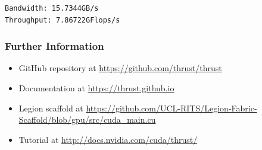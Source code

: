 \begin{Shaded}
\begin{Highlighting}[]

  \NormalTok{, }\NormalTok{, }\NormalTok{> \{}
    
      
    
     
    
     \NormalTok{()(}     \NormalTok{\{}
         
    \NormalTok{\}}
\NormalTok{\};}

    
\NormalTok{\}}
\end{Highlighting}
\end{Shaded}

\begin{verbatim}
Bandwidth: 15.7344GB/s
Throughput: 7.86722GFlops/s
\end{verbatim}

\subsubsection{Further Information}\label{further-information-1}

\begin{itemize}
\itemsep1pt\parskip0pt
\item
  GitHub repository at \url{https://github.com/thrust/thrust}
\item
  Documentation at \url{https://thrust.github.io}
\item
  Legion scaffold at
  \url{https://github.com/UCL-RITS/Legion-Fabric-Scaffold/blob/gpu/src/cuda_main.cu}
\item
  Tutorial at \url{http://docs.nvidia.com/cuda/thrust/}
\end{itemize}

